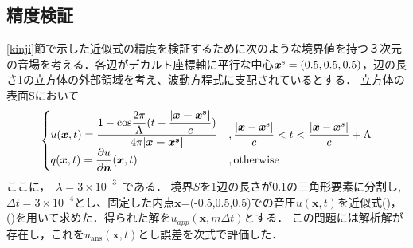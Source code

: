 \documentclass[dvipdfmx]{ampbt}
\begin{document}
\subsection{精度検証}
\ref{kinji}節で示した近似式の精度を検証するために次のような境界値を持つ３次元の音場を考える．各辺がデカルト座標軸に平行な中心$\bm{x}^{\rm{s}} =(0.5,0.5,0.5)$，辺の長さ1の立方体の外部領域を考え、波動方程式に支配されているとする．
立方体の表面Sにおいて
\begin{equation}
\begin{cases}
u(\bm{x},t)=\dfrac{1-{\rm{cos}}\dfrac{2\pi}{\Lambda} (t-\dfrac{|\bm{x-x^{\rm{s}}|}}{c})}{4\pi|\bm{x-x^{\rm{s}}|}}&,\dfrac{|\bm{x}-\bm{x}^{\mathrm{s}}|}{c}<t<\dfrac{|\bm{x}-\bm{x}^{s}|}{c}+\Lambda\\
q(\bm{x},t)=\dfrac{\partial u}{\partial {\bm{n}}}(\bm{x},t)&,\mathrm{otherwise}
\end{cases}
\end{equation}
ここに，\ $\lambda = 3 \times 10^{-3}$\ である．
境界$S$を1辺の長さが0.1の三角形要素に分割し,$\Delta t=3\times 10^{-4}$とし、固定した内点$\bm{x}$=(-0.5,0.5,0.5)での音圧$u(\bm{x},t)$を近似式()，()を用いて求めた．得られた解を$u_{app}(\bm{x},m\Delta t)$とする．
この問題には解析解が存在し，これを$u_{\mathrm{ans}}(\bm{x},t)$とし誤差を次式で評価した．


\end{document}

